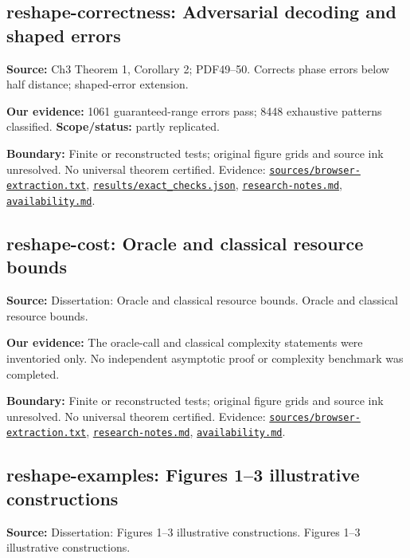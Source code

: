 \documentclass[11pt]{article}
\begin{document}
\subsection{reshape-correctness: Adversarial decoding and shaped errors}
\label{claim:reshape-correctness}
\textbf{Source:} Ch3 Theorem 1, Corollary 2; PDF49--50. Corrects phase errors below half distance; shaped-error extension.

\textbf{Our evidence:} 1061 guaranteed-range errors pass; 8448 exhaustive patterns classified. \textbf{Scope/status:} partly replicated.

\textbf{Boundary:} Finite or reconstructed tests; original figure grids and source ink unresolved. No universal theorem certified. Evidence: \href{https://github.com/alectionary/vibe-math/blob/master/formalization/quintavalle-hgp/sources/browser-extraction.txt}{\nolinkurl{sources/browser-extraction.txt}}, \href{https://github.com/alectionary/vibe-math/blob/master/formalization/quintavalle-hgp/results/exact_checks.json}{\nolinkurl{results/exact_checks.json}}, \href{https://github.com/alectionary/vibe-math/blob/master/formalization/quintavalle-hgp/research-notes.md}{\nolinkurl{research-notes.md}}, \href{https://github.com/alectionary/vibe-math/blob/master/formalization/quintavalle-hgp/availability.md}{\nolinkurl{availability.md}}.
\subsection{reshape-cost: Oracle and classical resource bounds}
\label{claim:reshape-cost}
\textbf{Source:} Dissertation: Oracle and classical resource bounds. Oracle and classical resource bounds.

\textbf{Our evidence:} The oracle-call and classical complexity statements were inventoried only. No independent asymptotic proof or complexity benchmark was completed.

\textbf{Boundary:} Finite or reconstructed tests; original figure grids and source ink unresolved. No universal theorem certified. Evidence: \href{https://github.com/alectionary/vibe-math/blob/master/formalization/quintavalle-hgp/sources/browser-extraction.txt}{\nolinkurl{sources/browser-extraction.txt}}, \href{https://github.com/alectionary/vibe-math/blob/master/formalization/quintavalle-hgp/research-notes.md}{\nolinkurl{research-notes.md}}, \href{https://github.com/alectionary/vibe-math/blob/master/formalization/quintavalle-hgp/availability.md}{\nolinkurl{availability.md}}.
\subsection{reshape-examples: Figures 1--3 illustrative constructions}
\label{claim:reshape-examples}
\textbf{Source:} Dissertation: Figures 1--3 illustrative constructions. Figures 1--3 illustrative constructions.
\end{document}
